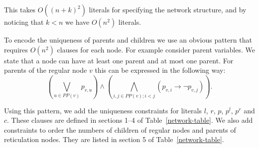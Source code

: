 \documentclass[runningheads, envcountsame, a4paper]{llncs}
\begin{document}
This takes $O((n + k)^2)$ literals for specifying the network structure, and by noticing that $k < n$ we have $O(n^2)$ literals.

To encode the uniqueness of parents and children we use an obvious pattern that requires $O(n^2)$ clauses for each node. For example consider 
parent variables. We state that a node can have at least one parent and at most one parent. For parents of the regular node $v$ this can be expressed 
in the following way: 
$$\left(\bigvee\limits_{u \in PP(v)} p_{v,u}\right) \wedge \left(\bigwedge\limits_{i, j \in PP(v);i < j} \left(p_{v,i} \rightarrow \neg p_{v,j}\right)\right).$$

Using this pattern, we add the uniqueness constraints for literals $l$, $r$, $p$, $p^l$, $p^r$ and $c$. 
These clauses are defined in sections 1--4 of Table~\ref{network-table}. 
We also add constraints to order the numbers of children of regular nodes and parents of reticulation nodes.
They are listed in section 5 of Table~\ref{network-table}.
\end{document}
